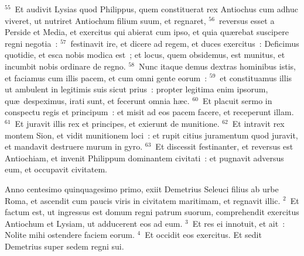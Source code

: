${}^{55}$~Et audivit Lysias quod Philippus, quem constituerat rex Antiochus cum adhuc viveret, ut nutriret Antiochum filium suum, et regnaret,
${}^{56}$~reversus esset a Perside et Media, et exercitus qui abierat cum ipso, et quia qu\ae rebat suscipere regni negotia~:
${}^{57}$~festinavit ire, et dicere ad regem, et duces exercitus~: Deficimus quotidie, et esca nobis modica est~; et locus, quem obsidemus, est munitus, et incumbit nobis ordinare de regno.
${}^{58}$~Nunc itaque demus dextras hominibus istis, et faciamus cum illis pacem, et cum omni gente eorum~:
${}^{59}$~et constituamus illis ut ambulent in legitimis suis sicut prius~: propter legitima enim ipsorum, qu\ae\ despeximus, irati sunt, et fecerunt omnia h\ae c.
${}^{60}$~Et placuit sermo in conspectu regis et principum~: et misit ad eos pacem facere, et receperunt illam.
${}^{61}$~Et juravit illis rex et principes, et exierunt de munitione.
${}^{62}$~Et intravit rex montem Sion, et vidit munitionem loci~: et rupit citius juramentum quod juravit, et mandavit destruere murum in gyro.
${}^{63}$~Et discessit festinanter, et reversus est Antiochiam, et invenit Philippum dominantem civitati~: et pugnavit adversus eum, et occupavit civitatem.

\lettrine[lines=3,image=true,loversize=0.05,lraise=-0.03]{A}{}nno centesimo quinquagesimo primo, exiit Demetrius Seleuci filius ab urbe Roma, et ascendit cum paucis viris in civitatem maritimam, et regnavit illic.
${}^{2}$~Et factum est, ut ingressus est domum regni patrum suorum, comprehendit exercitus Antiochum et Lysiam, ut adducerent eos ad eum.
${}^{3}$~Et res ei innotuit, et ait~: Nolite mihi ostendere faciem eorum.
${}^{4}$~Et occidit eos exercitus. Et sedit Demetrius super sedem regni sui.


